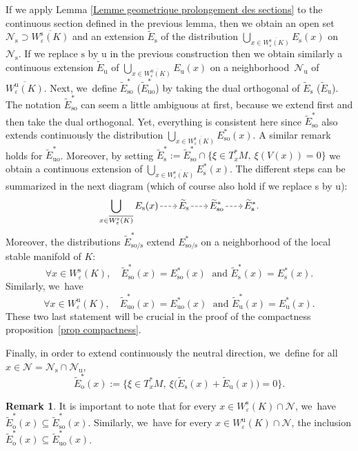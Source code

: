 \documentclass[JEP,XML,SOM,Unicode,NoEqCountersInSection,NoFloatCountersInSection,published]{cedram}
\newcommand{\ro}{\mathrm{o}}
\newcommand{\rs}{\mathrm{s}}
\newcommand{\rso}{\mathrm{so}}
\newcommand{\ru}{\mathrm{u}}
\newcommand{\ruo}{\mathrm{uo}}
\newcommand{\dradpl}{{\hspace*{-2.5mm}\begin{tikzcd}[ampersand replacement=\&,column sep = scriptsize]\mbox{}\ar[r,dashed]\&\mbox{}\end{tikzcd}\hspace*{-2.5mm}}}
\newcommand{\dratst}{{\hspace*{-2.5mm}\begin{tikzcd}[ampersand replacement=\&,column sep = small]\mbox{}\ar[r,dashed]\&\mbox{}\end{tikzcd}\hspace*{-2mm}}}
\let\drascst\dratst
\newcommand{\dra}{\mathchoice{\dradpl}{\dratst}{\drascst}{\drascst}}
\theoremstyle{definition}
\newtheorem{remark}[definition]{Remark}
\theoremstyle{plain}
\newcommand{\Ncal}{\mathcal{N}}
\begin{document}
If we apply Lemma \ref{Lemme geometrique prolongement des sections} to the continuous section defined in the previous lemma, then we obtain an open set $\Ncal_{\rs} \supset \overline{W_{\varepsilon}^\rs (K)} $ and an extension $\widetilde{E}_\rs$ of the distribution $\bigcup_{x \in \overline{W_{\varepsilon}^\rs (K)}}E_{\rs} (x)$ on $\Ncal_{\rs}$. If we replace $\rs$ by $\ru$ in the previous construction then we obtain similarly a continuous extension $\widetilde{E}_\ru$ of $ \bigcup_{x \in \overline{W_{\varepsilon}^\ru (K)}} E_{\ru} (x)$ on a neighborhood~$\Ncal_\ru$ of $\overline{W_{\varepsilon}^\ru (K)}$.
Next, we~define $ \widetilde{E}_{\rso}^*$ (\resp $\widetilde{E}_{\ruo}^*$) by taking the dual orthogonal of $\widetilde{E}_\rs$ (\resp $\widetilde{E}_\ru$). The notation $\widetilde{E}_{\rso}^*$ can seem a little ambiguous at first, because we extend first and then take the dual orthogonal. Yet, everything is consistent here since $\widetilde{E}_{\rso}^*$ also extends continuously the distribution $\bigcup_{x \in \overline{W_{\varepsilon}^\rs (K)}} E_{\rso}^* (x)$. A similar remark holds for $\widetilde{E}_{\ruo}^*$. Moreover, by setting $\widetilde{E}_\rs^*:= \widetilde{E}_{\rso}^* \cap \{\xi \in T_x^*M, \: \xi(V(x)) = 0\}$ we obtain a continuous extension of $\bigcup_{x \in \overline{W_{\varepsilon}^\rs (K)}}E_{\rs}^* (x)$. The different steps can be summarized in the next diagram (which of course also hold if we replace s by u):
\[
\bigcup_{x \in \overline{W_{\varepsilon}^\rs (K)}} E_\rs (x) \dra \widetilde{E}_\rs \dra \widetilde{E}_{\rso}^* \dra \widetilde{E}_\rs^*.
\]
Moreover, the distributions $\widetilde{E}_{\rso/\rs}^* $ extend $E_{\rso/\rs}^*$ on a neighborhood of the local stable manifold of $K$:
\[
\forall x \in W_{\varepsilon}^\rs (K), \quad \widetilde{E}_{\rso}^* (x) = E_{\rso}^* (x) \;\text{ and } \widetilde{E}_\rs^* (x) = E_\rs^* (x).
\]
Similarly, we~have
\[
\forall x \in W_{\varepsilon}^\ru (K), \quad \widetilde{E}_{\ruo}^* (x) = E_{\ruo}^* (x) \;\text{ and } \widetilde{E}_\ru^* (x) = E_\ru^* (x).
\]
These two last statement will be crucial in the proof of the compactness proposition~\ref{prop compactness}.

Finally, in order to extend continuously the neutral direction, we~define for all $x \in \Ncal =\Ncal_{\rs} \cap \Ncal_\ru$,
\[
\widetilde{E}_\ro^* (x):= \bigl\{ \xi \in T_x^* M, \: \xi \bigl(\widetilde{E}_\rs(x) + \widetilde{E}_\ru(x)\bigr) = 0 \bigr\}.
\]

\begin{remark}\label{remark: upper triangular block matrices}
It is important to note that for every $x \in W_{\varepsilon}^{\rs} (K) \cap \Ncal$, we~have $\widetilde{E}_\ro^* (x) \subseteq \widetilde{E}_{\rso}^* (x)$. Similarly, we~have for every $x \in W_{\varepsilon}^{\ru} (K) \cap \Ncal$, the inclusion $\widetilde{E}_\ro^* (x) \subseteq \widetilde{E}_{\ruo}^* (x)$.
\end{remark}
\end{document}
